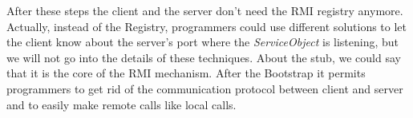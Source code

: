 After these steps the client and the server don't need the RMI registry anymore. Actually, instead of the Registry, programmers could use different solutions to let the client know about the server's port where the \textit{ServiceObject} is listening, but we will not go into the details of these techniques. 
About the stub, we could say that it is the core of the RMI mechanism. After the Bootstrap it permits programmers to get rid of the communication protocol between client and server and to easily make remote calls like local calls.
